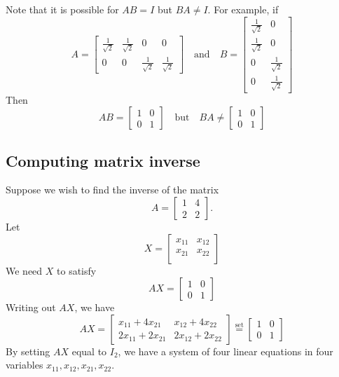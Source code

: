 \documentclass[10pt]{article}
\theoremstyle{definition}
\begin{document}
Note that it is possible for $AB=I$ but $BA\neq I$. For example, if
\begin{equation*}
  A=\begin{bmatrix}
    \frac{1}{\sqrt{2}} & \frac{1}{\sqrt{2}}& 0 & 0\\
    0&0&\frac{1}{\sqrt{2}}&\frac{1}{\sqrt{2}}
  \end{bmatrix}
  \quad \text{and} \quad
  B=
  \begin{bmatrix}
    \frac{1}{\sqrt{2}} & 0\\
    \frac{1}{\sqrt{2}} & 0\\
    0&\frac{1}{\sqrt{2}}\\
    0&\frac{1}{\sqrt{2}}
  \end{bmatrix}
\end{equation*}
Then
\begin{equation*}
  AB =
  \begin{bmatrix}
    1&0\\
    0&1
  \end{bmatrix}
  \quad \text{but} \quad 
  BA \neq
  \begin{bmatrix}
    1&0\\
    0&1
  \end{bmatrix}
\end{equation*}
\subsection{Computing matrix inverse}

Suppose we wish to find the inverse of the matrix
\begin{equation*}
  A =
  \begin{bmatrix}
    1&4\\
    2&2
  \end{bmatrix}.
\end{equation*}
Let
\begin{equation*}
  X =
  \begin{bmatrix}
    x_{11}&x_{12}\\
    x_{21}&x_{22}\\
  \end{bmatrix}
\end{equation*}
We need $X$ to satisfy
\begin{equation*}
  AX =
  \begin{bmatrix}
    1&0\\
    0&1
  \end{bmatrix}
\end{equation*}
Writing out $AX$, we have
\begin{equation*}
  AX =
  \begin{bmatrix}
    x_{11}+4x_{21}& x_{12}+4x_{22}\\
    2x_{11}+2x_{21}& 2x_{12}+2x_{22}
  \end{bmatrix}
  \overset{\text{set}}{=}
  \begin{bmatrix}
    1&0\\
    0&1
  \end{bmatrix}
\end{equation*}
By setting $AX$ equal to $I_{2}$, we have a system of four linear equations in
four variables $x_{11},x_{12},x_{21},x_{22}$.
\end{document}
